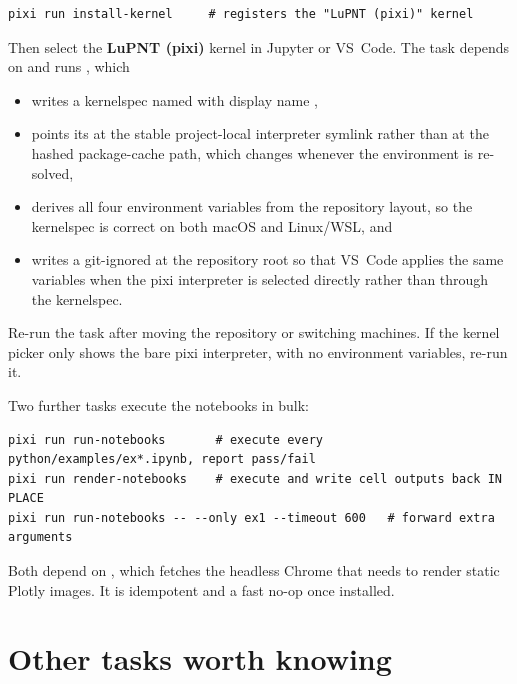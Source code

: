 \begin{lstlisting}[language=shell]
pixi run install-kernel     # registers the "LuPNT (pixi)" kernel
\end{lstlisting}

Then select the \textbf{LuPNT (pixi)} kernel in Jupyter or VS~Code. The task
depends on  and runs , which

\begin{itemize}[leftmargin=*]
  \item writes a kernelspec named  with display name
    ,
  \item points its  at the stable project-local interpreter
    symlink  rather than at the hashed
    package-cache path, which changes whenever the environment is re-solved,
  \item derives all four environment variables from the repository layout, so
    the kernelspec is correct on both macOS and Linux/WSL, and
  \item writes a git-ignored  at the repository root so that VS~Code
    applies the same variables when the pixi interpreter is selected directly
    rather than through the kernelspec.
\end{itemize}

Re-run the task after moving the repository or switching machines. If the
kernel picker only shows the bare pixi interpreter, with no environment
variables, re-run it.

Two further tasks execute the notebooks in bulk:

\begin{lstlisting}[language=shell]
pixi run run-notebooks       # execute every python/examples/ex*.ipynb, report pass/fail
pixi run render-notebooks    # execute and write cell outputs back IN PLACE
pixi run run-notebooks -- --only ex1 --timeout 600   # forward extra arguments
\end{lstlisting}

Both depend on , which fetches the headless Chrome
that  needs to render static Plotly images. It is idempotent and
a fast no-op once installed.

\section{Other tasks worth knowing}
\label{sec:gs-tasks}

